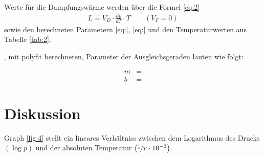 \justifying Werte für die Dampfungswärme werden über die Formel \eqref{eq:2}  
\begin{align}
    L= V_D \cdot \frac{dp}{dT}\cdot T \qquad (V_F = 0)
\end{align}
sowie den berechneten Parametern \eqref{eq:}, \eqref{eq:} und den Temperaturwerten aus Tabelle \ref{tab:2}.

\justifying, mit polyfit \cite{numpy} berechneten,  Parameter der Ausgleichsgeraden lauten wie folgt:

\begin{align}
    m &= \text{}\\
    b &= \text{}
\end{align}


\section{Diskussion}

\justifying Graph \ref{fig:4} stellt ein lineares Verhältniss zwischen dem Logarithmus des Drucks $\left( \log{p} \right)$ und 
der absoluten Temperatur $\left( \sfrac{1}{T} \cdot 10^{-3} \right)$.


\newpage
\printbibliography


